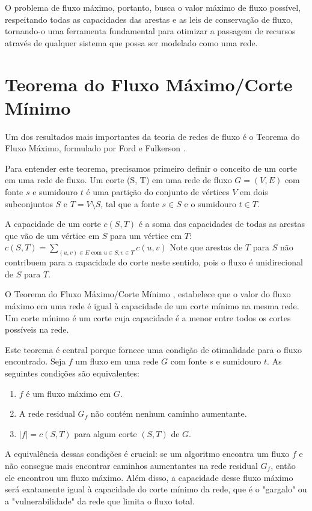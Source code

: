 \documentclass[12pt]{article}
\begin{document}
\noindent O problema de fluxo máximo, portanto, busca o valor máximo de fluxo possível, respeitando todas as capacidades das arestas e as leis de conservação de fluxo, tornando-o uma ferramenta fundamental para otimizar a passagem de recursos através de qualquer sistema que possa ser modelado como uma rede.

\section{Teorema do Fluxo Máximo/Corte Mínimo}

Um dos resultados mais importantes da teoria de redes de fluxo é o Teorema do Fluxo Máximo, formulado por Ford e Fulkerson \cite{ford1956maximal}.

\noindent Para entender este teorema, precisamos primeiro definir o conceito de um corte em uma rede de fluxo. Um corte (S, T) em uma rede de fluxo $G=(V, E)$ com fonte $s$ e sumidouro $t$ é uma partição do conjunto de vértices $V$ em dois subconjuntos $S$ e $T = V \setminus S$, tal que a fonte $s \in S$ e o sumidouro $t \in T$.

A capacidade de um corte $c(S, T)$ é a soma das capacidades de todas as arestas que vão de um vértice em $S$ para um vértice em $T$: $c(S, T) = \sum_{(u,v) \in E \text{ com } u \in S, v \in T} c(u, v)$ Note que arestas de $T$ para $S$ não contribuem para a capacidade do corte neste sentido, pois o fluxo é unidirecional de $S$ para $T$.

\noindent O Teorema do Fluxo Máximo/Corte Mínimo \cite{cormen2009}, estabelece que o valor do fluxo máximo em uma rede é igual à capacidade de um corte mínimo na mesma rede. Um corte mínimo é um corte cuja capacidade é a menor entre todos os cortes possíveis na rede.

\noindent Este teorema é central porque fornece uma condição de otimalidade para o fluxo encontrado. Seja $f$ um fluxo em uma rede $G$ com fonte $s$ e sumidouro $t$. As seguintes condições são equivalentes:


\begin{enumerate}
    \item $f$ é um fluxo máximo em $G$.
    \item  A rede residual $G_f$ não contém nenhum caminho aumentante.
    \item $|f| = c(S, T)$ para algum corte $(S, T)$ de $G$.
\end{enumerate}

\noindent A equivalência dessas condições é crucial: se um algoritmo encontra um fluxo $f$ e não consegue mais encontrar caminhos aumentantes na rede residual $G_f$, então ele encontrou um fluxo máximo. Além disso, a capacidade desse fluxo máximo será exatamente igual à capacidade do corte mínimo da rede, que é o "gargalo" ou a "vulnerabilidade" da rede que limita o fluxo total. 
\end{document}
